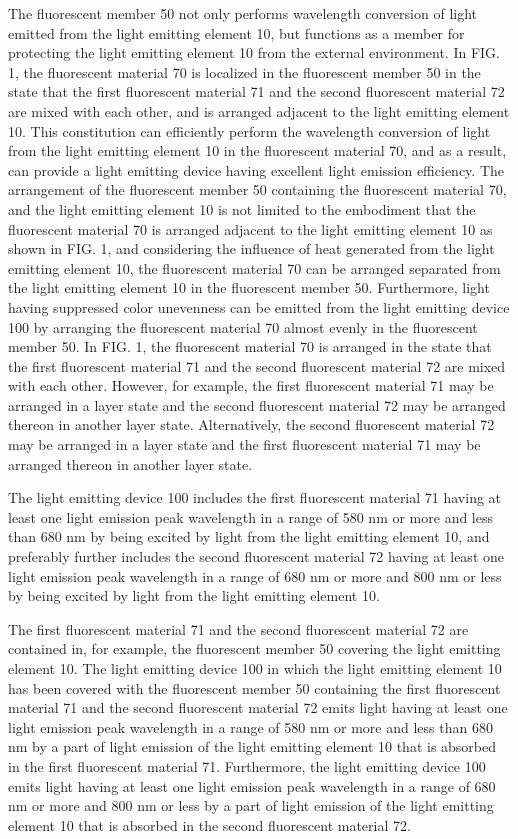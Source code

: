 \documentclass[11pt,a4paper]{article}
\begin{document}
The fluorescent member 50 not only performs wavelength conversion of light emitted from the light emitting element 10, but functions as a member for protecting the light emitting element 10 from the external environment. In FIG. 1, the fluorescent material 70 is localized in the fluorescent member 50 in the state that the first fluorescent material 71 and the second fluorescent material 72 are mixed with each other, and is arranged adjacent to the light emitting element 10. This constitution can efficiently perform the wavelength conversion of light from the light emitting element 10 in the fluorescent material 70, and as a result, can provide a light emitting device having excellent light emission efficiency. The arrangement of the fluorescent member 50 containing the fluorescent material 70, and the light emitting element 10 is not limited to the embodiment that the fluorescent material 70 is arranged adjacent to the light emitting element 10 as shown in FIG. 1, and considering the influence of heat generated from the light emitting element 10, the fluorescent material 70 can be arranged separated from the light emitting element 10 in the fluorescent member 50. Furthermore, light having suppressed color unevenness can be emitted from the light emitting device 100 by arranging the fluorescent material 70 almost evenly in the fluorescent member 50. In FIG. 1, the fluorescent material 70 is arranged in the state that the first fluorescent material 71 and the second fluorescent material 72 are mixed with each other. However, for example, the first fluorescent material 71 may be arranged in a layer state and the second fluorescent material 72 may be arranged thereon in another layer state. Alternatively, the second fluorescent material 72 may be arranged in a layer state and the first fluorescent material 71 may be arranged thereon in another layer state.

The light emitting device 100 includes the first fluorescent material 71 having at least one light emission peak wavelength in a range of 580 nm or more and less than 680 nm by being excited by light from the light emitting element 10, and preferably further includes the second fluorescent material 72 having at least one light emission peak wavelength in a range of 680 nm or more and 800 nm or less by being excited by light from the light emitting element 10.

The first fluorescent material 71 and the second fluorescent material 72 are contained in, for example, the fluorescent member 50 covering the light emitting element 10. The light emitting device 100 in which the light emitting element 10 has been covered with the fluorescent member 50 containing the first fluorescent material 71 and the second fluorescent material 72 emits light having at least one light emission peak wavelength in a range of 580 nm or more and less than 680 nm by a part of light emission of the light emitting element 10 that is absorbed in the first fluorescent material 71. Furthermore, the light emitting device 100 emits light having at least one light emission peak wavelength in a range of 680 nm or more and 800 nm or less by a part of light emission of the light emitting element 10 that is absorbed in the second fluorescent material 72.
\end{document}
